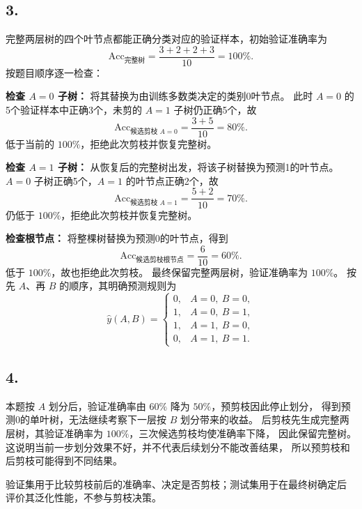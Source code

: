 \documentclass[10pt]{article}
\begin{document}
\subsection*{3.}
完整两层树的四个叶节点都能正确分类对应的验证样本，初始验证准确率为
\[
\mathrm{Acc}_{\text{完整树}}=\frac{3+2+2+3}{10}=100\%.
\]
按题目顺序逐一检查：

\textbf{检查 $A=0$ 子树：}
将其替换为由训练多数类决定的类别0叶节点。
此时 $A=0$ 的5个验证样本中正确3个，未剪的 $A=1$ 子树仍正确5个，故
\[
\mathrm{Acc}_{\text{候选剪枝 }A=0}=\frac{3+5}{10}=80\%.
\]
低于当前的 $100\%$，拒绝此次剪枝并恢复完整树。

\textbf{检查 $A=1$ 子树：}
从恢复后的完整树出发，将该子树替换为预测1的叶节点。
$A=0$ 子树正确5个，$A=1$ 的叶节点正确2个，故
\[
\mathrm{Acc}_{\text{候选剪枝 }A=1}=\frac{5+2}{10}=70\%.
\]
仍低于 $100\%$，拒绝此次剪枝并恢复完整树。

\textbf{检查根节点：}
将整棵树替换为预测0的叶节点，得到
\[
\mathrm{Acc}_{\text{候选剪枝根节点}}=\frac6{10}=60\%.
\]
低于 $100\%$，故也拒绝此次剪枝。
最终保留完整两层树，验证准确率为 ${100\%}$。
按先 $A$、再 $B$ 的顺序，其明确预测规则为
\[
{\hat y(A,B)=
\begin{cases}
0,& A=0,\ B=0,\\
1,& A=0,\ B=1,\\
1,& A=1,\ B=0,\\
0,& A=1,\ B=1.
\end{cases}}
\]

\subsection*{4.}
本题按 $A$ 划分后，验证准确率由 $60\%$ 降为 $50\%$，预剪枝因此停止划分，
得到预测0的单叶树，无法继续考察下一层按 $B$ 划分带来的收益。
后剪枝先生成完整两层树，其验证准确率为 $100\%$，三次候选剪枝均使准确率下降，
因此保留完整树。这说明当前一步划分效果不好，并不代表后续划分不能改善结果，
所以预剪枝和后剪枝可能得到不同结果。

验证集用于比较剪枝前后的准确率、决定是否剪枝；测试集用于在最终树确定后
评价其泛化性能，不参与剪枝决策。
\end{document}
